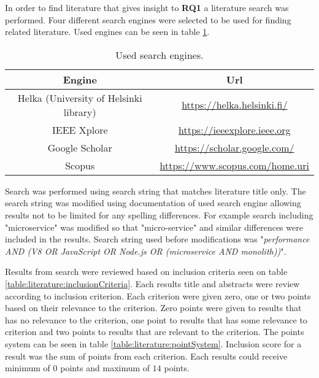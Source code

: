 In order to find literature that gives insight to \textbf{RQ1} a literature search was performed.
Four different search engines were selected to be used for finding related literature.
Used engines can be seen in table \ref{table:literature:searchEngines}.

\begin{table}[ht!]
    \begin{tabular}{| c | c |} 
        \hline
        Engine
        & Url
        \\ [0.5ex] \hline
        
        Helka (University of Helsinki library)
        & \url{https://helka.helsinki.fi/}
        \\ \hline
        
        IEEE Xplore
        & \url{https://ieeexplore.ieee.org}
        \\ \hline
        
        Google Scholar
        & \url{https://scholar.google.com/}
        \\ \hline

        Scopus
        & \url{https://www.scopus.com/home.uri}
        \\ \hline
    \end{tabular}    
    \caption{Used search engines.}
    \label{table:literature:searchEngines}
\end{table}

Search was performed using search string that matches literature title only.
The search string was modified using documentation of used search engine allowing results not to be limited for any spelling differences.
For example search including "microservice" was modified so that "micro-service" and similar differences were included in the results.
Search string used before modifications was "\textit{performance AND (V8 OR JavaScript OR Node.js OR (microservice AND monolith))}".

Results from search were reviewed based on inclusion criteria seen on table \ref{table:literature:inclusionCriteria}.
Each results title and abstracts were review according to inclusion criterion.
Each criterion were given zero, one or two points based on their relevance to the criterion.
Zero points were given to results that has no relevance to the criterion, one point to results that has some relevance to criterion and two points to results that are relevant to the criterion.
The points system can be seen in table \ref{table:literature:pointSystem}.
Inclusion score for a result was the sum of points from each criterion.
Each results could receive minimum of $0$ points and maximum of $14$ points.

